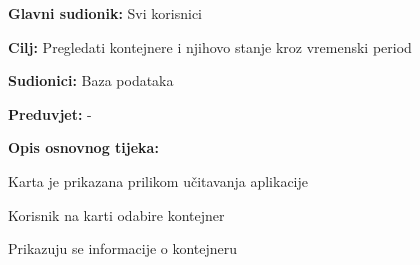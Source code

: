 			\noindent {}
			\begin{packed_item}
				
				\item \textbf{Glavni sudionik:} Svi korisnici
				\item  \textbf{Cilj:} Pregledati kontejnere i njihovo stanje kroz vremenski period 
				\item  \textbf{Sudionici:} Baza podataka
				\item  \textbf{Preduvjet:} -
				\item  \textbf{Opis osnovnog tijeka:}
				
				\item[] \begin{packed_enum}
					
					\item Karta je prikazana prilikom učitavanja aplikacije
					\item Korisnik na karti odabire kontejner 
					\item Prikazuju se informacije o kontejneru 
					
				\end{packed_enum}
			\end{packed_item}
			
